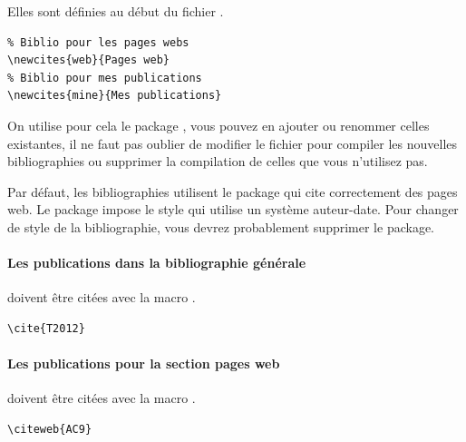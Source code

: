 Elles sont définies au début du fichier .

\begin{framed}\vspace{-0.75em}
  \begin{verbatim}
% Biblio pour les pages webs
\newcites{web}{Pages web}
% Biblio pour mes publications
\newcites{mine}{Mes publications}
\end{verbatim}\vspace{-0.75em}
\end{framed}

On utilise pour cela le package , vous pouvez en ajouter ou renommer celles existantes, il ne faut pas oublier de modifier le fichier  pour compiler les nouvelles bibliographies ou supprimer la compilation de celles que vous n'utilisez pas.

Par défaut, les bibliographies utilisent le package qui cite correctement des pages web.
Le package impose le style  qui utilise un système auteur-date.
Pour changer de style de la bibliographie, vous devrez probablement supprimer le package.

\paragraph{Les publications dans la bibliographie générale} doivent être citées avec la macro .

\begin{framed}
  \noindent\cite{T2012}\vspace{-0.75em}
  \begin{verbatim}\cite{T2012}\end{verbatim}\vspace{-0.75em}
\end{framed}

\paragraph{Les publications pour la section pages web} doivent être citées avec la macro .

\begin{framed}
  \noindent{} \vspace{-0.75em}
  \begin{verbatim}\citeweb{AC9}\end{verbatim}\vspace{-0.75em}
\end{framed}

